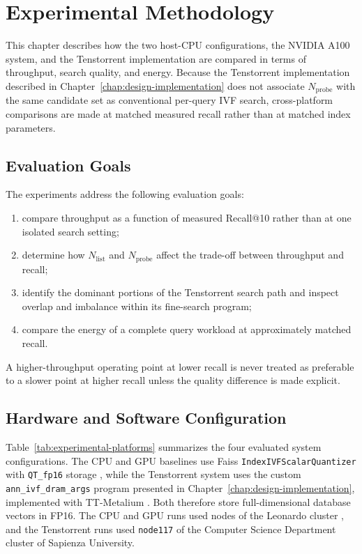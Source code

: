 \chapter{Experimental Methodology}
\label{chap:methodology}

This chapter describes how the two host-CPU configurations, the NVIDIA A100
system, and the Tenstorrent implementation are compared in terms of
throughput, search quality, and energy. Because the Tenstorrent implementation
described in Chapter~\ref{chap:design-implementation} does not associate
\(N_{\mathrm{probe}}\) with the same candidate set as conventional per-query IVF
search, cross-platform comparisons are made at matched measured recall rather
than at matched index parameters.

\section{Evaluation Goals}
\label{sec:evaluation-goals}

The experiments address the following evaluation goals:

\begin{enumerate}
    \item compare throughput as a function of measured Recall@10 rather than at
    one isolated search setting;
    \item determine how \(N_{\mathrm{list}}\) and \(N_{\mathrm{probe}}\)
    affect the trade-off between throughput and recall;
    \item identify the dominant portions of the Tenstorrent search path and
    inspect overlap and imbalance within its fine-search program;
    \item compare the energy of a complete query workload at approximately
    matched recall.
\end{enumerate}

A higher-throughput operating point at lower recall is never treated as
preferable to a slower point at higher recall unless the quality difference is
made explicit.

\section{Hardware and Software Configuration}
\label{sec:experimental-platforms}

Table~\ref{tab:experimental-platforms} summarizes the four evaluated system
configurations. The CPU and GPU baselines use Faiss
\texttt{IndexIVFScalarQuantizer} with \texttt{QT\_fp16} storage \cite{faiss},
while the Tenstorrent system uses the custom \texttt{ann\_ivf\_dram\_args}
program presented in Chapter~\ref{chap:design-implementation}, implemented
with TT-Metalium \cite{tenstorrent_metalium_architecture}. Both therefore store
full-dimensional database vectors in FP16. The CPU and GPU runs used nodes of the Leonardo
cluster \cite{leonardo}, and the Tenstorrent runs used \texttt{node117} of the Computer Science
Department cluster of Sapienza University.

